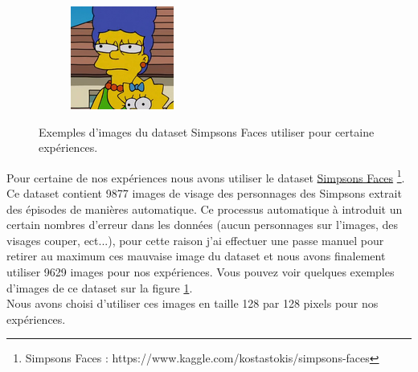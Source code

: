 \documentclass[11pt,francais]{article}
\begin{document}
\begin{figure}[!h]
\begin{subfigure}[b]{0.2\textwidth}
    \end{subfigure}
    \begin{subfigure}[b]{0.2\textwidth}
        \includegraphics[width=\textwidth]{Figures/25.png}
    \end{subfigure}
    \caption{Exemples d'images du dataset Simpsons Faces utiliser pour certaine expériences.}
    \label{fig:fig1}
\end{figure}

Pour certaine de nos expériences nous avons utiliser le dataset \href{https://www.kaggle.com/kostastokis/simpsons-faces}{Simpsons Faces} \footnote{\label{note2}Simpsons Faces : https://www.kaggle.com/kostastokis/simpsons-faces}. Ce dataset contient 9877 images de visage des personnages des Simpsons extrait des épisodes de manières automatique. Ce processus  automatique à introduit un certain nombres d'erreur dans les données (aucun personnages sur l'images, des visages couper, ect...), pour cette raison j'ai effectuer une passe manuel pour retirer au maximum ces mauvaise image du dataset et nous avons finalement utiliser 9629 images pour nos expériences. Vous pouvez voir quelques exemples d'images de ce dataset sur la figure \ref{fig:fig1}.\\
Nous avons choisi d'utiliser ces images en taille 128 par 128 pixels pour nos expériences.
\end{document}

